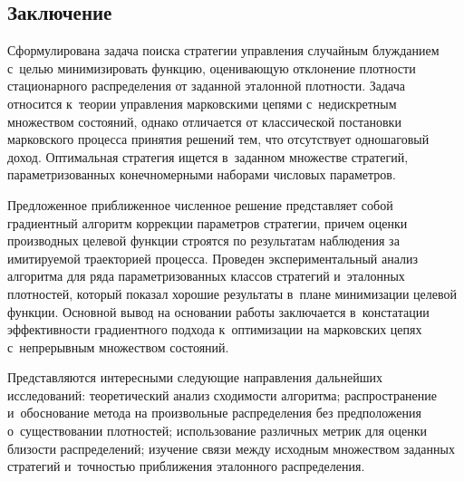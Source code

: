 \begin{multicols}{2}

\section{Заключение}
  
  Сформулирована задача поиска стратегии управ\-ле\-ния случайным 
блужданием с~целью минимизировать функцию, оценивающую отклонение 
плотности стационарного распределения от заданной эталонной плот\-ности.
Задача относится к~теории управ\-ле\-ния марковскими цепями с~недискретным 
множеством со\-сто\-яний, однако отличается от классической постановки 
марковского процесса принятия решений тем, что отсутствует одношаговый 
доход. Оптимальная стратегия ищется в~заданном множестве стратегий, 
параметризованных конечномерными наборами чис\-ло\-вых па\-ра\-мет\-ров.
{

} 

Предложенное при\-бли\-жен\-ное чис\-лен\-ное решение пред\-став\-ля\-ет собой 
градиентный алгоритм коррекции па\-ра\-мет\-ров стратегии, причем оценки\linebreak 
производных целевой функции строятся по результатам наблюдения за 
имитируемой траекторией процесса. Проведен экспериментальный анализ 
алгоритма для ряда па\-ра\-мет\-ри\-зо\-ван\-ных классов стратегий и~эталонных 
плотностей, который показал хорошие результаты в~плане минимизации 
целевой функции. Основной вывод на основании работы за\-клю\-ча\-ет\-ся 
в~констатации эффективности градиентного подхода к~оптимизации на 
марковских цепях с~непрерывным множеством со\-сто\-яний. 

Пред\-став\-ля\-ют\-ся 
интересными сле\-ду\-ющие на\-прав\-ле\-ния дальнейших исследований:
теоретический анализ сходимости алгоритма;
распространение и~обоснование метода на произвольные\linebreak 
распределения без предположения о~существовании плотностей;
  использование различных мет\-рик для оценки бли\-зости 
распределений;
  изучение связи между исходным множеством заданных стратегий 
и~точ\-ностью при\-бли\-же\-ния эталонного распределения.
  

\end{multicols}
